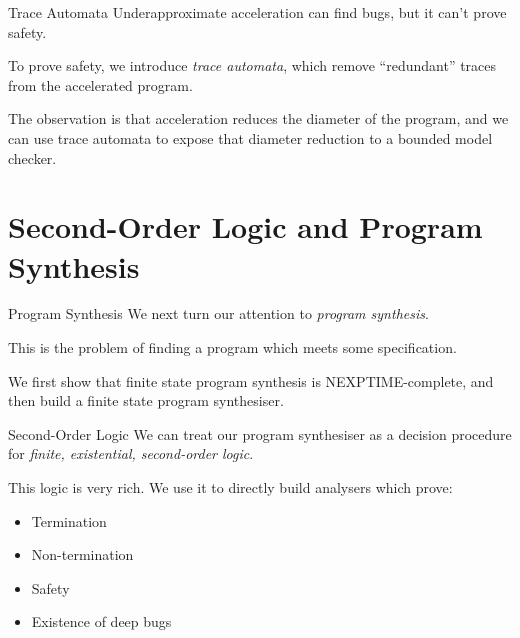 \documentclass[xcolor=pdftex,t,11pt]{beamer}
\begin{document}
\begin{frame}{Trace Automata}
 Underapproximate acceleration can find bugs, but it can't prove safety.

 \vspace{1em}

 To prove safety, we introduce \emph{trace automata}, which remove ``redundant'' traces
 from the accelerated program.
 
 \vspace{1em}
 
 The observation is that acceleration reduces the diameter of the program, and we can
 use trace automata to expose that diameter reduction to a bounded model checker.
\end{frame}


\section{Second-Order Logic and Program Synthesis}

\begin{frame}{Program Synthesis}
 We next turn our attention to \emph{program synthesis}.
 
 \vspace{1em}
 
 This is the problem of finding a program which meets some specification.
 
 \vspace{1em}
 
 We first show that finite state program synthesis is NEXPTIME-complete, and then build
 a finite state program synthesiser.
\end{frame}

\begin{frame}{Second-Order Logic}
 We can treat our program synthesiser as a decision procedure for \emph{finite, existential, second-order logic}.
 
 \vspace{1em}
 
 This logic is very rich.  We use it to directly build analysers which prove:
 
 \begin{itemize}
  \item Termination
  \item Non-termination
  \item Safety
  \item Existence of deep bugs
 \end{itemize}
\end{frame}
\end{document}
